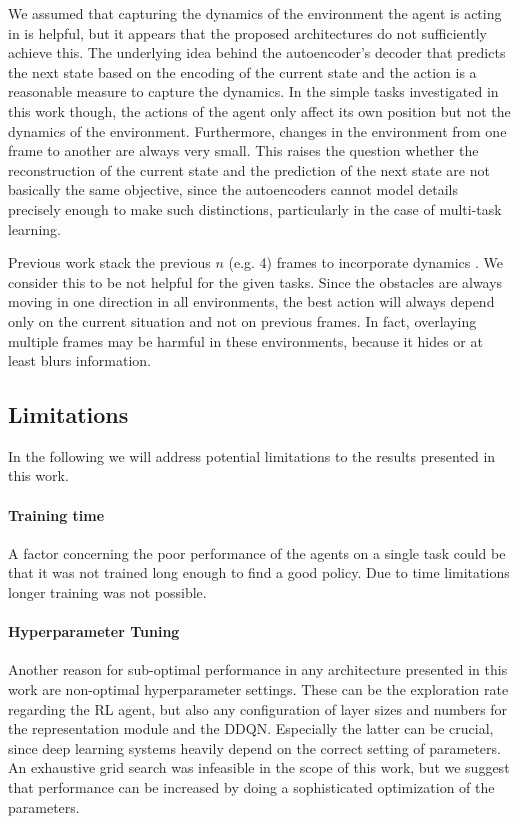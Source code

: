 We assumed that capturing the dynamics of the environment the agent is acting in is helpful, but it appears that the proposed architectures do not sufficiently achieve this. The underlying idea behind the autoencoder's decoder that predicts the next state based on the encoding of the current state and the action is a reasonable measure to capture the dynamics. In the simple tasks investigated in this work though, the actions of the agent only affect its own position but not the dynamics of the environment. Furthermore, changes in the environment from one frame to another are always very small. This raises the question whether the reconstruction of the current state and the prediction of the next state are not basically the same objective, since the autoencoders cannot model details precisely enough to make such distinctions, particularly in the case of multi-task learning.

Previous work stack the previous $n$ (e.g. 4) frames to incorporate dynamics \citep{DQN, DDQN, DuelingDQN}. We consider this to be not helpful for the given tasks. Since the obstacles are always moving in one direction in all environments, the best action will always depend only on the current situation and not on previous frames. In fact, overlaying multiple frames may be harmful in these environments, because it hides or at least blurs information.


\subsection{Limitations}
In the following we will address potential limitations to the results presented in this work.

\paragraph{Training time} A factor concerning the poor performance of the agents on a single task could be that it was not trained long enough to find a good policy. Due to time limitations longer training was not possible.

\paragraph{Hyperparameter Tuning} Another reason for sub-optimal performance in any architecture presented in this work are non-optimal hyperparameter settings. These can be the exploration rate regarding the RL agent, but also any configuration of layer sizes and numbers for the representation module and the DDQN. Especially the latter can be crucial, since deep learning systems heavily depend on the correct setting of parameters. An exhaustive grid search was infeasible in the scope of this work, but we suggest that performance can be increased by doing a sophisticated optimization of the parameters.

